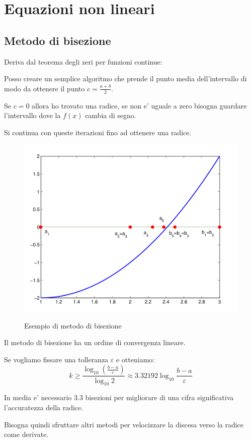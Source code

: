 \chapter{Equazioni non lineari}

\section{Metodo di bisezione}
Deriva dal teorema degli zeri per funzioni continue:

Posso creare un semplice algoritmo che prende il punto media dell'intervallo di modo da 
ottenere il punto $c=\frac{a+b}{2}$.

Se $c=0$ allora ho trovato una radice, se non e' uguale a zero bisogna guardare l'intervallo
dove la $f(x)$ cambia di segno.

Si continua con queste iterazioni fino ad ottenere una radice.

\begin{figure}[h!]
  \centering
  \includegraphics[width=0.5\linewidth]{./images/bisezione.png}
  \label{fig:bisezione}
  \caption{Esempio di metodo di bisezione}
\end{figure}

Il metodo di bisezione ha un ordine di convergenza lineare.

Se vogliamo fissare una tolleranza $\varepsilon$ e otteniamo:
\begin{equation}
  k \geq \frac{\log_{10}(\frac{b-a}{\varepsilon})}{\log_{10}2} \approx 3.32192 \log_{10}\frac{b-a}{\varepsilon}
\end{equation}


In media e' necessario 3.3 bisezioni per migliorare di una cifra significativa l'accuratezza della radice.

Bisogna quindi sfruttare altri metodi per velocizzare la discesa verso la radice come derivate.


